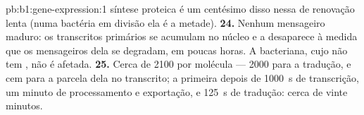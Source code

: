 \begin{solution}{pb:b1:gene-expression:1}
síntese proteica é um centésimo disso nessa  de renovação lenta
(numa bactéria em divisão ela é a metade).
\textbf{24.} Nenhum mensageiro maduro: os transcritos primários se
acumulam no núcleo e a  desaparece à medida que os mensageiros
dela se degradam, em poucas horas. A  bacteriana, cujo  não
tem , não é afetada.
\textbf{25.} Cerca de 2100  por molécula --- 2000 para a tradução, e
cem para a parcela dela no transcrito; a primeira  depois de
\qty{1000}{s} de transcrição, um minuto de processamento e exportação, e
\qty{125}{s} de tradução: cerca de vinte minutos.
\end{solution}
